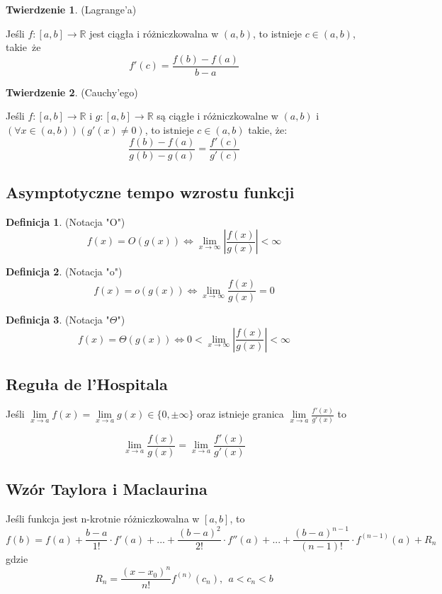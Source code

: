 \documentclass{article}
\theoremstyle{definition}
\newtheorem{de}{Definicja}[subsection]
\theoremstyle{definition}
\newtheorem{tw}{Twierdzenie}[subsection]
\theoremstyle{definition}
\begin{document}
\begin{tw}
(Lagrange'a)

Jeśli $f:[a,b]\to\mathbb{R}$ jest ciągła i różniczkowalna w $(a,b)$, to 
istnieje $c \in (a,b)$, takie że
$$
f'(c) = \frac{f(b) - f(a)}{b-a}
$$
\end{tw}

\begin{tw}
(Cauchy'ego)

Jeśli $f:[a,b] \to \mathbb{R}$ i $g:[a,b] \to \mathbb{R}$
są ciągłe i różniczkowalne w $(a,b)$ i 
$ (\forall x \in (a,b))(g'(x) \neq 0) $, to istnieje $c \in (a,b)$ takie, że:
$$
\frac{f(b) - f(a)}{g(b)-g(a)} = \frac{f'(c)}{g'(c)}
$$
\end{tw}
\subsection{Asymptotyczne tempo wzrostu funkcji}

\begin{de}
(Notacja "O")
$$
f(x) = O(g(x)) \iff \lim_{x \to \infty} \left|\frac{f(x)}{g(x)}\right|< \infty
$$
\end{de}

\begin{de}
(Notacja "o")
$$
f(x) = o(g(x)) \iff \lim_{x \to \infty} \frac{f(x)}{g(x)}=0
$$
\end{de}

\begin{de}
(Notacja "$\Theta$")
$$
f(x) = \Theta(g(x)) \iff 0<\lim_{x \to \infty}
\left|\frac{f(x)}{g(x)}\right|< \infty
$$
\end{de}

\subsection{Reguła de l'Hospitala}

Jeśli $\lim\limits_{x \to a} f(x) = \lim\limits_{x \to a} g(x) \in \{0, \pm\infty \}$
oraz istnieje granica $\lim\limits_{x \to a} \frac{f'(x)}{g'(x)}$
to

$$
\lim_{x \to a} \frac{f(x)}{g(x)} = \lim_{x \to a} \frac{f'(x)}{g'(x)}
$$
\subsection{Wzór Taylora i Maclaurina}

Jeśli funkcja jest n-krotnie różniczkowalna w $[a,b]$, to
$$
f(b) = f(a) + \frac{b-a}{1!} \cdot f'(a) + ... +
       \frac{(b-a)^2}{2!} \cdot f''(a) + ... +
       \frac{(b-a)^{n-1}}{(n-1)!} \cdot f^{(n-1)}(a) + R_n
$$
gdzie
$$
R_n = \frac{(x-x_0)^n}{n!}f^{(n)}(c_n), \ \ a<c_n<b
$$
\end{document}
